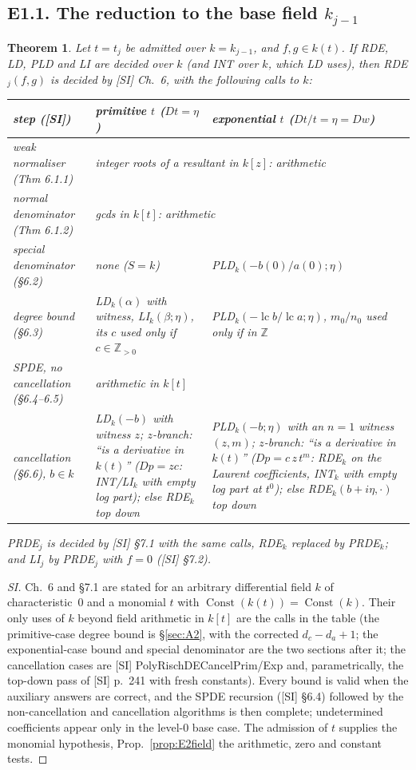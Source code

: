 \documentclass[11pt]{article}
\newtheorem{theorem}{Theorem}[section]
\theoremstyle{definition}
\theoremstyle{remark}
\newcommand{\Z}{\mathbb{Z}}
\newcommand{\lc}{\operatorname{lc}}
\begin{document}
\subsection*{E1.1. The reduction to the base field $k_{j-1}$}

\begin{theorem}\label{thm:E1rde}
Let $t=t_j$ be admitted over $k=k_{j-1}$, and $f,g\in k(t)$. If RDE, LD, PLD and LI are
decided over $k$ (and INT over $k$, which LD uses), then RDE$_j(f,g)$ is decided by [SI]
Ch.~6, with the following calls to $k$:
\begin{center}\small
\begin{tabular}{lp{}p{}}
\toprule
step ([SI]) & primitive $t$ ($Dt=\eta$) & exponential $t$ ($Dt/t=\eta=Dw$)\\
\midrule
weak normaliser (Thm 6.1.1) & \multicolumn{2}{l}{integer roots of a resultant in $k[z]$: arithmetic}\\
normal denominator (Thm 6.1.2) & \multicolumn{2}{l}{gcds in $k[t]$: arithmetic}\\
special denominator (\S6.2) & none ($S=k$) & PLD$_k(-b(0)/a(0);\eta)$\\
degree bound (\S6.3) & LD$_k(\alpha)$ with witness, LI$_k(\beta;\eta)$, its $c$ used only if $c\in\Z_{>0}$ & PLD$_k(-\lc b/\lc a;\eta)$, $m_0/n_0$ used only if in $\Z$\\
SPDE, no cancellation (\S6.4--6.5) & \multicolumn{2}{l}{arithmetic in $k[t]$}\\
cancellation (\S6.6), $b\in k$ & LD$_k(-b)$ \emph{with witness} $z$; $z$-branch: ``is a derivative in $k(t)$'' ($Dp=zc$: INT/LI$_k$ with empty log part); else RDE$_k$ top down & PLD$_k(-b;\eta)$ \emph{with an $n=1$ witness} $(z,m)$; $z$-branch: ``is a derivative in $k(t)$'' ($Dp=c\,z\,t^m$: RDE$_k$ on the Laurent coefficients, INT$_k$ with empty log part at $t^0$); else RDE$_k(b+i\eta,\cdot)$ top down\\
\bottomrule
\end{tabular}
\end{center}
PRDE$_j$ is decided by [SI] \S7.1 with the same calls, RDE$_k$ replaced by PRDE$_k$; and
LI$_j$ by PRDE$_j$ with $f=0$ ([SI] \S7.2).
\end{theorem}
\begin{proof}
[SI] Ch.~6 and \S7.1 are stated for an arbitrary differential field $k$ of characteristic~0
and a monomial $t$ with $\operatorname{Const}(k(t))=\operatorname{Const}(k)$. Their only
uses of $k$ beyond field arithmetic in $k[t]$ are the calls in the table (the
primitive-case degree bound is \S\ref{sec:A2}, with the corrected $d_c-d_a+1$; the
exponential-case bound and special denominator are the two sections after it; the cancellation cases are [SI]
PolyRischDECancelPrim/Exp and, parametrically, the top-down pass of [SI] p.~241 with fresh
constants). Every bound is valid when the auxiliary answers are correct, and the SPDE
recursion ([SI] \S6.4) followed by the non-cancellation and cancellation algorithms is then
complete; undetermined coefficients appear only in the level-0 base case. The admission of $t$
supplies the monomial hypothesis, Prop.~\ref{prop:E2field} the arithmetic, zero and
constant tests.
\end{proof}
\end{document}
